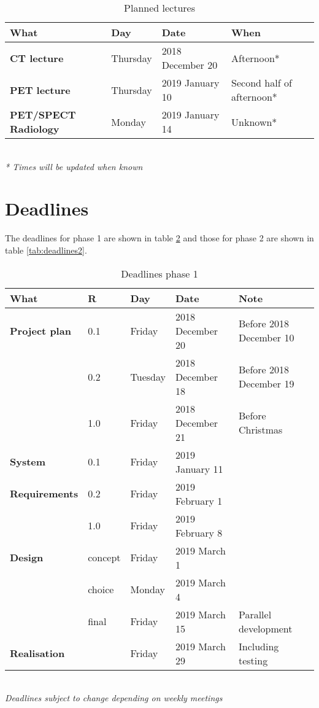 \begin{table} [h!]
	\begin{tabular}{l|lll}
		\textbf{What} 		&	Day 		&	Date				&	When \\
		\hline
		\textbf{CT lecture}	&	Thursday	&	2018 December 20	& Afternoon* \\
		\rowcolor{Gray}
		\textbf{PET lecture}&	Thursday	& 	2019 January 10 	&	Second half of afternoon* \\
		\textbf{PET/SPECT Radiology}& 	Monday 	&	2019 January 14	& Unknown* \\
		\hline
	\end{tabular} \\
	\textit{* Times will be updated when known}
	\caption{Planned lectures}
	\label{tab:lectures}
\end{table}

\newpage
\section{Deadlines}
The deadlines for phase 1 are shown in table \ref{tab:deadlines} and those for phase 2 are shown in table \ref{tab:deadlines2}.

\begin{table}[h!]
	\begin{tabular}{l|llll}
		\textbf{What} 		&	R	& 	Day	&	Date	&	Note \\
		\hline
		\textbf{Project plan}& 0.1	& Friday 		& 2018 December 20	&	Before 2018 December 10 \\
		\rowcolor{Gray}
		 	&	0.2 	&	 Tuesday & 2018 December 18 & Before 2018 December 19\\
		 	&	1.0		&	Friday	&  2018 December 21 & Before Christmas\\
		 	\hline
		 	\rowcolor{Gray}
		\textbf{System} & 0.1 & Friday & 2019 January 11 & \\
		\textbf{Requirements}& 0.2 & Friday & 2019 February 1 & \\
		\rowcolor{Gray}
			&	1.0		& Friday &	2019 February 8 &\\
		\hline
		\textbf{Design} & concept &Friday & 2019 March 1 & \\
		\rowcolor{Gray}
		 & choice & Monday & 2019 March 4 &  \\
		 & final  & Friday & 2019 March 15 & Parallel development \\
		 \hline
		 \rowcolor{Gray}
		 \textbf{Realisation} & & Friday & 2019 March 29 & Including testing\\
		 \hline
	\end{tabular} \\
	\textit{Deadlines subject to change depending on weekly meetings}
	\caption{Deadlines phase 1}
	\label{tab:deadlines}
\end{table}

